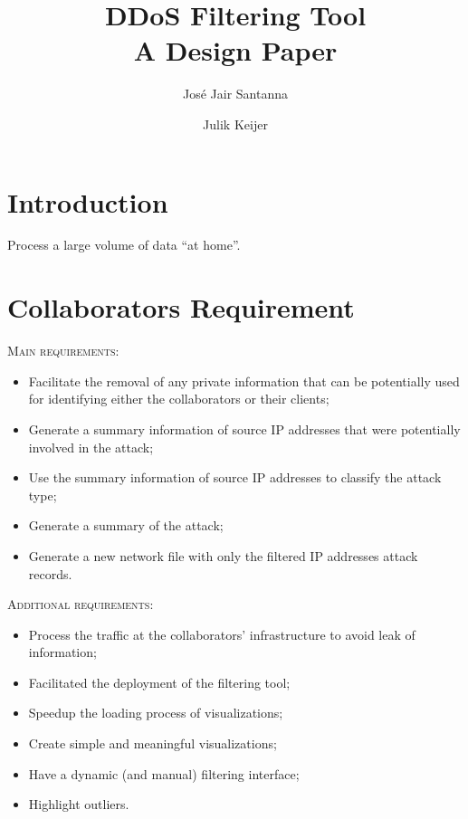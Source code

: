 \documentclass{llncs}
\begin{document}
\title{\huge DDoS Filtering Tool\\ \small A Design Paper}

\author{Jos\'e Jair Santanna \and Julik Keijer}
\maketitle             


\section{Introduction}
Process a large volume of data ``at home''.

\section{Collaborators Requirement}

\noindent
\textsc{Main requirements:} 
\begin{itemize}
	\item Facilitate the removal of any private information that can be potentially used for identifying either the collaborators or their clients;
	\item Generate a summary information of source IP addresses that were potentially involved in the attack;
	\item Use the summary information of source IP addresses to classify the attack type;
	\item Generate a summary of the attack; 
	\item Generate a new network file with only the filtered IP addresses attack records.
\end{itemize}

\noindent
\textsc{Additional requirements:}
\begin{itemize}
	\item Process the traffic at the collaborators' infrastructure to avoid leak of information;
	\item Facilitated the deployment of the filtering tool; 
	\item Speedup the loading process of visualizations;
	\item Create simple and meaningful visualizations;
	\item Have a dynamic (and manual) filtering interface;
	\item Highlight outliers.
\end{itemize}
\end{document}
